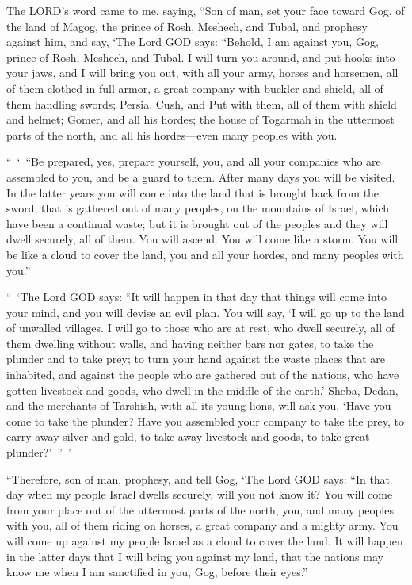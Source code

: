 \mychapter{} \myverse*{}The LORD’s word came to me, saying,
\myverse{}“Son of man, set your face toward Gog, of the land of Magog, the prince of
Rosh, Meshech, and Tubal, and prophesy against him,
\myverse{}and say, ‘The Lord GOD says: “Behold, I am against you, Gog, prince of Rosh,
Meshech, and Tubal.
\myverse{}I will turn you around, and put hooks into your jaws, and I will bring you
out, with all your army, horses and horsemen, all of them clothed in full armor, a great company with
buckler and shield, all of them handling swords;
\myverse{}Persia, Cush, and Put with them, all of them with shield and helmet;
\myverse{}Gomer, and all his hordes; the house of Togarmah in the uttermost parts of
the north, and all his hordes—even many peoples with you.

\myverse{}“ ‘ “Be prepared, yes, prepare yourself, you, and all your companies
who are assembled to you, and be a guard to them.
\myverse{}After many days you will be visited. In the latter years you will come into
the land that is brought back from the sword, that is gathered out of many peoples, on the mountains of
Israel, which have been a continual waste; but it is brought out of the peoples and they will dwell securely,
all of them.
\myverse{}You will ascend. You will come like a storm. You will be like a cloud to cover
the land, you and all your hordes, and many peoples with you.”

\myverse{}“ ‘The Lord GOD says: “It will happen in that day that things
will come into your mind, and you will devise an evil plan.
\myverse{}You will say, ‘I will go up to the land of unwalled villages. I will go to
those who are at rest, who dwell securely, all of them dwelling without walls, and having neither bars
nor gates,
\myverse{}to take the plunder and to take prey; to turn your hand against the waste
places that are inhabited, and against the people who are gathered out of the nations, who have gotten
livestock and goods, who dwell in the middle of the earth.’
\myverse{}Sheba, Dedan, and the merchants of Tarshish, with all its young lions, will
ask you, ‘Have you come to take the plunder? Have you assembled your company to take the prey, to carry
away silver and gold, to take away livestock and goods, to take great plunder?’ ” ’

\myverse{}“Therefore, son of man, prophesy, and tell Gog, ‘The Lord GOD
says: “In that day when my people Israel dwells securely, will you not know it?
\myverse{}You will come from your place out of the uttermost parts of the north, you,
and many peoples with you, all of them riding on horses, a great company and a mighty army.
\myverse{}You will come up against my people Israel as a cloud to cover the land. It
will happen in the latter days that I will bring you against my land, that the nations may know me when
I am sanctified in you, Gog, before their eyes.”

